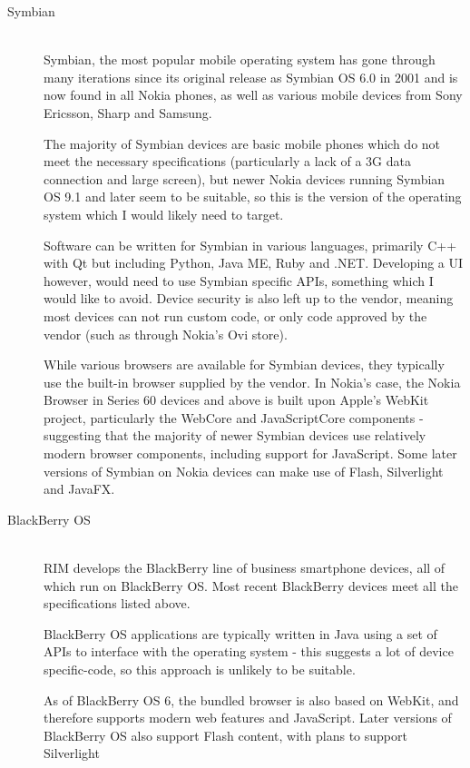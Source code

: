 \begin{description}
\item[Symbian] \hfill \\
Symbian\cite{symbian:web}, the most popular mobile operating system has gone through many iterations since its original release as Symbian OS 6.0 in 2001 and is now found in all Nokia phones, as well as various mobile devices from Sony Ericsson, Sharp and Samsung.

The majority of Symbian devices are basic mobile phones which do not meet the necessary specifications (particularly a lack of a 3G data connection and large screen), but newer Nokia devices running Symbian OS 9.1 and later seem to be suitable, so this is the version of the operating system which I would likely need to target.

Software can be written for Symbian in various languages, primarily C++ with Qt but including Python, Java ME, Ruby and .NET. Developing a UI however, would need to use Symbian specific APIs, something which I would like to avoid. Device security is also left up to the vendor, meaning most devices can not run custom code, or only code approved by the vendor (such as through Nokia's Ovi store).

While various browsers are available for Symbian devices, they typically use the built-in browser supplied by the vendor. In Nokia's case, the Nokia Browser in Series 60 devices and above is built upon Apple's WebKit project\cite{nokia:browser}, particularly the WebCore and JavaScriptCore components - suggesting that the majority of newer Symbian devices use relatively modern browser components, including support for JavaScript. Some later versions of Symbian on Nokia devices can make use of Flash, Silverlight and JavaFX.

\item[BlackBerry OS] \hfill \\
RIM develops the BlackBerry\cite{blackberry:web} line of business smartphone devices, all of which run on BlackBerry OS. Most recent BlackBerry devices meet all the specifications listed above.

BlackBerry OS applications are typically written in Java using a set of APIs to interface with the operating system - this suggests a lot of device specific-code, so this approach is unlikely to be suitable.

As of BlackBerry OS 6, the bundled browser is also based on WebKit\cite{rim:browser}, and therefore supports modern web features and JavaScript. Later versions of BlackBerry OS also support Flash content, with plans to support Silverlight


\end{description}
